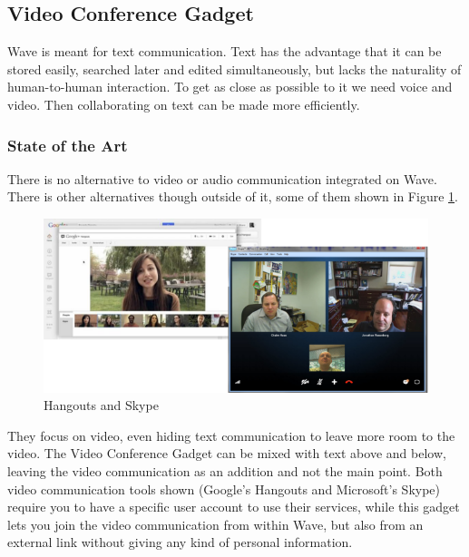 \subsection{Video Conference Gadget}
Wave is meant for text communication. Text has the advantage that it can be stored easily, searched later and edited simultaneously, but lacks the naturality of human-to-human interaction. To get as close as possible to it we need voice and video. Then collaborating on text can be made more efficiently.

\subsubsection{State of the Art}
There is no alternative to video or audio communication integrated on Wave. There is other alternatives though outside of it, some of them shown in Figure \ref{fig:skype_hangouts}.\\[.2cm]
\begin{figure}[h]
  \center
    \includegraphics[keepaspectratio, scale=0.6]{Media/Captures/Soa/skype_hangouts.png}
  \caption{Hangouts and Skype}
  \label{fig:skype_hangouts}
\end{figure}
They focus on video, even hiding text communication to leave more room to the video. The Video Conference Gadget can be mixed with text above and below, leaving the video communication as an addition and not the main point. Both video communication tools shown (Google's Hangouts and Microsoft's Skype) require you to have a specific user account to use their services, while this gadget lets you join the video communication from within Wave, but also from an external link without giving any kind of personal information.

